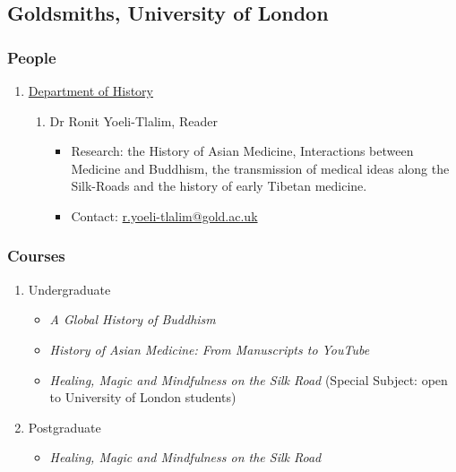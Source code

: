 \documentclass[a4paper,10.5pt]{article}
\begin{document}
\subsection{Goldsmiths, University of London}
\label{sec:org0a89792}
\subsubsection{People}
\label{sec:org6314b42}
\begin{enumerate}
\item \href{https://www.gold.ac.uk/history/}{Department of History}
\label{sec:org78b778c}
\begin{enumerate}
\item Dr Ronit Yoeli-Tlalim, Reader
\label{sec:orgb7e0532}
\begin{itemize}
\item Research: the History of Asian Medicine, Interactions between Medicine and Buddhism, the transmission of medical ideas along the Silk-Roads and the history of early Tibetan medicine.\\
\item Contact: \href{mailto:r.yoeli-tlalim@gold.ac.uk}{r.yoeli-tlalim@gold.ac.uk}\\
\end{itemize}
\end{enumerate}
\end{enumerate}
\subsubsection{Courses}
\label{sec:orgfd06c6a}
\begin{enumerate}
\item Undergraduate
\label{sec:orgea3f80f}
\begin{itemize}
\item \emph{A Global History of Buddhism}\\
\item \emph{History of Asian Medicine: From Manuscripts to YouTube}\\
\item \emph{Healing, Magic and Mindfulness on the Silk Road} (Special Subject: open to University of London students)\\
\end{itemize}
\item Postgraduate
\label{sec:orgbcb6a7a}
\begin{itemize}
\item \emph{Healing, Magic and Mindfulness on the Silk Road}\\
\end{itemize}
\end{enumerate}
\end{document}
